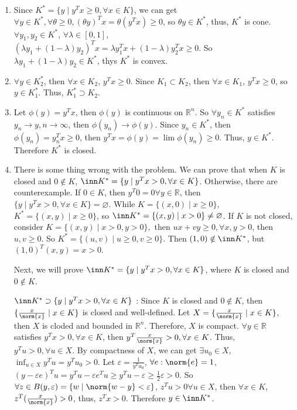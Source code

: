 \documentclass{ctexart}
\begin{document}
\begin{solution}
  \begin{enumerate}
    \item Since \(K^*=\{y \mid y^Tx \geq 0, \forall x \in K\} \), we can get \(\forall y \in K^*, \forall \theta  \geq 0, (\theta y)^Tx= \theta (y^Tx) \geq 0 \),
      so \(\theta y \in K^* \), thus, \(K^* \) is cone. \(\forall y_{1},y_{2} \in K^* \), \(\forall \lambda \in [0,1] \), \((\lambda y_{1} + (1-\lambda)y_{2} )^Tx=\lambda y_{1}^Tx + (1-\lambda)y_{2}^Tx \geq 0\).
      So \(\lambda y_1 + (1-\lambda)y_2 \in K^* \), thys \(K^* \) is convex.
    \item \(\forall y \in K_{2}^* \), then \(\forall x \in K_{2} \), \(y^Tx \geq 0 \). Since \(K_1 \subset K_2 \), then \(\forall x \in  K_1  \), \(y^Tx \geq 0 \), so \(y \in K_{1}^* \). Thus, \(K_{1}^* \supset K_2 \).
    \item Let \(\phi(y)=y^Tx \), then \(\phi(y) \) is continuous on \(\mathbb{R}^n \). So \(\forall y_n \in K^* \) satisfies \(y_n \to y, n \to \infty \), then \(\phi(y_n) \to \phi(y) \).
      Since \(y_n \in K^* \), then \(\phi(y_n)=y_n^Tx \geq 0 \), then \(y^Tx=\phi(y) = \lim \phi(y_n) \geq 0 \). Thus, \(y \in K^* \). Therefore \(K^* \) is closed.
    \item There is some thing wrong with the problem. We can prove that when \(K \) is closed and \(0 \notin K \),
      \( \inn K^* = \{y \mid y^Tx > 0, \forall x \in K\}\). Otherwise, there are counterexample.
      If \(0 \in K \), then \(y^T 0=0 \forall y \in \mathbb{R} \), then \(\{y \mid y^Tx >0, \forall x \in K\} = \varnothing \).
      While \(K=\{(x,0)\mid x \geq 0\} \), \(K^*=\{(x,y) \mid x \geq 0\} \), so \( \inn K^*= \{(x,y) \mid x >0\} \neq \varnothing \).
      If \(K \) is not closed, consider \(K=\{(x,y) \mid x >0,y>0\}, \) then \(ux + vy \geq 0, \forall x,y >0 \), then \(u,v \geq 0 \).
      So \(K^*=\{(u,v) \mid u \geq 0, v \geq 0\} \). Then \((1,0) \notin  \inn K^* \), but \((1,0)^T(x,y)=x >0 \).

      Next, we will prove \(\inn K^*=\{y \mid y^Tx >0,\forall x \in K\} \), where \(K \) is closed and \(0 \notin K \).

      \(\inn K^* \supset \{y \mid y^Tx >0, \forall x \in K\} \) :
      Since \(K \) is closed and \(0 \notin K \), then \(\{\frac{x}{\norm{x}} \mid x \in K\} \) is closed and well-defined.
      Let \(X=\{\frac{x}{\norm{x}} \mid x \in K\} \), then \(X \) is cloded and bounded in \(\mathbb{R}^n \).
      Therefore, \(X \) is compact.
      \(\forall y \in \mathbb{R} \) satisfies \( y^Tx >0, \forall x \in K\), then \(y^T \frac{x}{\norm{x}}>0, \forall x \in K \). Thus,
      \(y^Tu >0, \forall u \in X \). By compactness of \(X \), we can get \(\exists u_{0} \in X\), \(\inf_{u \in X} y^Tu= y^Tu_0 >0\).
      Let \(\varepsilon = \frac{1}{y^Tu_0} \), \(\forall e: \norm{e}=1 \), \((y-\varepsilon e)^T u =y^Tu - \varepsilon e^Tu \geq y^Tu - \varepsilon \geq \frac{1}{2}\varepsilon >0 \).
      So \(\forall z \in B(y,\varepsilon)= \{w \mid \norm{w-y} < \varepsilon \} \), \(z^Tu >0 \forall u \in X\), then \(\forall x \in K \), \(z^T (\frac{x}{\norm{x}}) >0 \),
      thus, \(z^Tx >0 \). Therefore \(y \in \inn K^* \).


\end{enumerate}
\end{solution}
\end{document}
